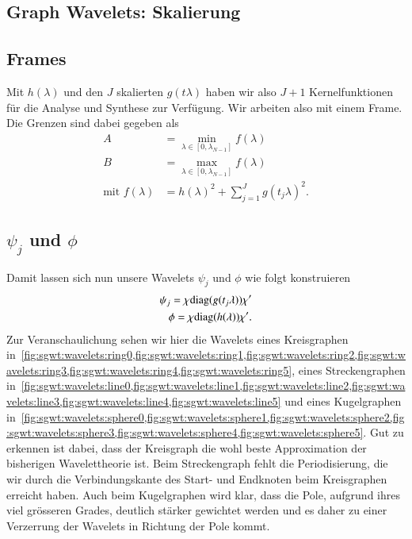 \subsection{Graph Wavelets: Skalierung\label{subsec:sgwt:gwt:scaling}}

\subsection{Frames}

Mit $h(\lambda)$ und den $J$ skalierten $g(t\lambda)$ haben wir also $J + 1$ 
Kernelfunktionen f\"ur die Analyse und Synthese zur Verf\"ugung. Wir arbeiten 
also mit einem Frame. Die Grenzen sind dabei gegeben als
\begin{align*}
A &= \min_{\lambda \in \left[0, \lambda_{N-1}\right]} f(\lambda) \\
B &= \max_{\lambda \in \left[0, \lambda_{N-1}\right]} f(\lambda) \\
\text{mit } f(\lambda) &= h(\lambda)^2 + \sum_{j = 1}^{J} g(t_j\lambda)^2.
\end{align*}

\subsection{\texorpdfstring{$\psi_j$}{psi} und \texorpdfstring{$\phi$}{phi}}
Damit lassen sich nun unsere Wavelets $\psi_j$ und $\phi$ wie folgt konstruieren
\begin{align}
\psi_j = \chi \diag{g(t_j\lambda)} \chi' 
\label{eq:sgwt:psi}
\\
\phi = \chi \diag{h(\lambda)} \chi'.
\label{eq:sgwt:phi}
\end{align}
Zur Veranschaulichung sehen wir hier die Wavelets eines Kreisgraphen 
in~\cref{fig:sgwt:wavelets:ring0,fig:sgwt:wavelets:ring1,fig:sgwt:wavelets:ring2,fig:sgwt:wavelets:ring3,fig:sgwt:wavelets:ring4,fig:sgwt:wavelets:ring5},
 eines Streckengraphen 
in~\cref{fig:sgwt:wavelets:line0,fig:sgwt:wavelets:line1,fig:sgwt:wavelets:line2,fig:sgwt:wavelets:line3,fig:sgwt:wavelets:line4,fig:sgwt:wavelets:line5}
 und eines Kugelgraphen 
in~\cref{fig:sgwt:wavelets:sphere0,fig:sgwt:wavelets:sphere1,fig:sgwt:wavelets:sphere2,fig:sgwt:wavelets:sphere3,fig:sgwt:wavelets:sphere4,fig:sgwt:wavelets:sphere5}.
Gut zu erkennen ist dabei, dass der Kreisgraph die wohl beste Approximation der 
bisherigen Wavelettheorie ist. Beim Streckengraph fehlt die Periodisierung, die 
wir durch die Verbindungskante des Start- und Endknoten beim Kreisgraphen 
erreicht haben. Auch beim Kugelgraphen wird klar, dass die Pole, aufgrund ihres 
viel gr\"osseren Grades, deutlich st\"arker gewichtet werden und es daher zu 
einer Verzerrung der Wavelets in Richtung der Pole kommt.

